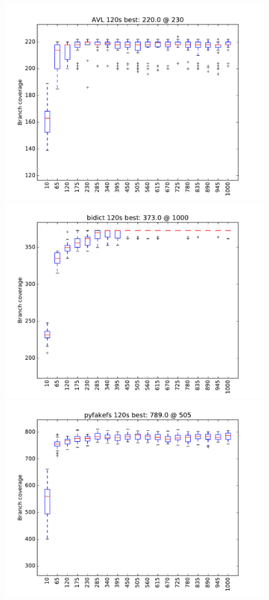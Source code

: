 \documentclass[sigplan,review]{acmart}
\begin{document}
\begin{figure}
  \includegraphics[width=0.9\columnwidth]{graphs/AVLrand120}
  \includegraphics[width=0.9\columnwidth]{graphs/bidictrand120}
\includegraphics[width=0.9\columnwidth]{graphs/pyfakefsrand120}

\end{figure}
\end{document}
